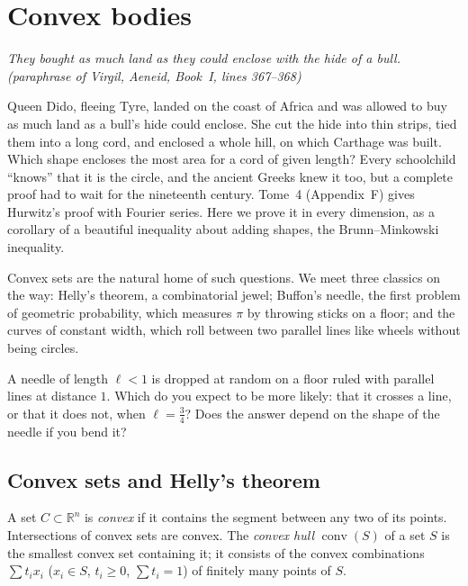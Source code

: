 \chapter{Convex bodies}\label{geometry:ch:convex}

\begin{center}\itshape
They bought as much land as they could enclose with the hide of a bull.
\upshape(paraphrase of Virgil, \emph{Aeneid}, Book~I, lines 367--368)
\end{center}

Queen Dido, fleeing Tyre, landed on the coast of Africa and was allowed to buy as much land as a bull's hide could enclose. She cut the hide into thin strips,
tied them into a long cord, and enclosed a whole hill, on which Carthage was built. Which shape encloses the most area for a cord of given length? Every
schoolchild ``knows'' that it is the circle, and the ancient Greeks knew it too, but a complete proof had to wait for the nineteenth century. Tome~4
(Appendix~F) gives Hurwitz's proof with Fourier series. Here we prove it in every dimension, as a corollary of a beautiful inequality about adding
shapes, the Brunn--Minkowski inequality.

Convex sets are the natural home of such questions. We meet three classics on the way: Helly's theorem, a combinatorial jewel; Buffon's needle, the
first problem of geometric probability, which measures $\pi$ by throwing sticks on a floor; and the curves of constant width, which roll between two parallel
lines like wheels without being circles.

\begin{think}
A needle of length $\ell<1$ is dropped at random on a floor ruled with parallel lines at distance $1$. Which do you expect to be more likely: that it
crosses a line, or that it does not, when $\ell=\frac34$? Does the answer depend on the shape of the needle if you bend it?
\end{think}

\section{Convex sets and Helly's theorem}

A set $C\subset\mathbb R^n$ is \emph{convex} if it contains the segment between any two of its points. Intersections of convex sets are convex. The
\emph{convex hull} $\operatorname{conv}(S)$ of a set $S$ is the smallest convex set containing it; it consists of the convex combinations
$\sum t_ix_i$ ($x_i\in S$, $t_i\ge0$, $\sum t_i=1$) of finitely many points of $S$.

